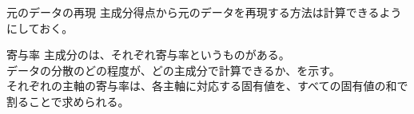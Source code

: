 \documentclass[dvipdfmx,autodetect-engine, unicode, 10pt, aspectratio=169]{beamer}
\begin{document}
\begin{frame}{元のデータの再現}
    主成分得点から元のデータを再現する方法は計算できるようにしておく。
\end{frame}

\begin{frame}{寄与率}
    主成分のは、それぞれ寄与率というものがある。\\
    データの分散のどの程度が、どの主成分で計算できるか、を示す。\\
    それぞれの主軸の寄与率は、各主軸に対応する固有値を、すべての固有値の和で割ることで求められる。
\end{frame}
\end{document}
